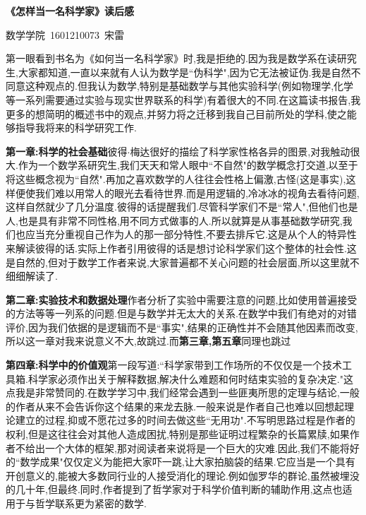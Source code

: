 \documentclass[b5paper]{ctexart}
\begin{document}
\pagestyle{plain}
\noindent
{}
\begin{center}
\textbf{《怎样当一名科学家》读后感}
\end{center}
\hspace{250pt}数学学院~1601210073~宋雷
\par
第一眼看到书名为《如何当一名科学家》时,我是拒绝的.因为我是数学系在读研究生,大家都知道,一直以来就有人认为数学是``伪科学",因为它无法被证伪.我是自然不同意这种观点的.但我认为数学,特别是基础数学与其他实验科学(例如物理学,化学等一系列需要通过实验与现实世界联系的科学)有着很大的不同.在这篇读书报告,我更多的想简明的概述书中的观点,并努力将之迁移到我自己目前所处的学科,使之能够指导我将来的科学研究工作.\par
\textbf{第一章:科学的社会基础}彼得$\cdot$梅达很好的描绘了科学家性格各异的图景,对我触动很大.作为一个数学系研究生,我们天天和常人眼中``不自然"的数学概念打交道,以至于将这些概念视为``自然".再加之喜欢数学的人往往会性格上偏激,古怪(这是事实),这样便使我们难以用常人的眼光去看待世界.而是用逻辑的,冷冰冰的视角去看待问题,这样自然就少了几分温度.彼得的话提醒我们.尽管科学家们不是``常人",但他们也是人,也是具有非常不同性格,用不同方式做事的人.所以就算是从事基础数学研究,我们也应当充分重视自己作为人的那一部分特性,不要去排斥它.这是从个人的特异性来解读彼得的话.实际上作者引用彼得的话是想讨论科学家们这个整体的社会性.这是自然的,但对于数学工作者来说,大家普遍都不关心问题的社会层面,所以这里就不细细解读了.\par
\textbf{第二章:实验技术和数据处理}作者分析了实验中需要注意的问题,比如使用普遍接受的方法等等一列系的问题.但是与数学并无太大的关系.在数学中我们有绝对的对错评价,因为我们依据的是逻辑而不是``事实",结果的正确性并不会随其他因素而改变,所以这一章对我来说意义不大,故跳过.而\textbf{第三章,第五章}同理也跳过\par
\textbf{第四章:科学中的价值观}第一段写道:``科学家带到工作场所的不仅仅是一个技术工具箱.科学家必须作出关于解释数据,解决什么难题和何时结束实验的复杂决定."这点我是非常赞同的.在数学学习中,我们经常会遇到一些匪夷所思的定理与结论,一般的作者从来不会告诉你这个结果的来龙去脉.一般来说是作者自己也难以回想起理论建立的过程,抑或不愿花过多的时间去做这些``无用功".不写明思路过程是作者的权利,但是这往往会对其他人造成困扰,特别是那些证明过程繁杂的长篇累牍,如果作者不给出一个大体的框架,那对阅读者来说将是一个巨大的灾难.因此,我们不能将好的``数学成果"仅仅定义为能把大家吓一跳,让大家拍脑袋的结果.它应当是一个具有开创意义的,能被大多数同行业的人接受消化的理论.例如伽罗华的群论,虽然被埋没的几十年,但最终.同时,作者提到了哲学家对于科学价值判断的辅助作用,这点也适用于与哲学联系更为紧密的数学.\par
\end{document}
